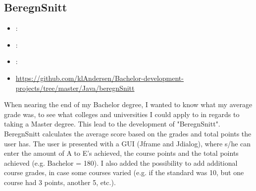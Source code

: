 \subsection{BeregnSnitt}
\label{sec:beregnsnitt}
\begin{itemize} 
	\item {}: 
	\item {}: 
	\item {}: 
	\item {} \url{https://github.com/klAndersen/Bachelor-development-projects/tree/master/Java/beregnSnitt}
\end{itemize} 
When nearing the end of my Bachelor degree, I wanted to know what my average grade was, to see what colleges and universities I could apply to in regards to taking a Master degree. 
This lead to the development of "BeregnSnitt". 
BeregnSnitt calculates the average score based on the grades and total points the user has.
\vspace{0.5em}\newline
The user is presented with a GUI (Jframe and Jdialog), where s/he can enter the amount of A to E's achieved, the course points and the total points achieved (e.g. Bachelor = 180). 
I also added the possibility to add additional course grades, in case some courses varied (e.g. if the standard was 10, but one course had 3 points, another 5, etc.).

